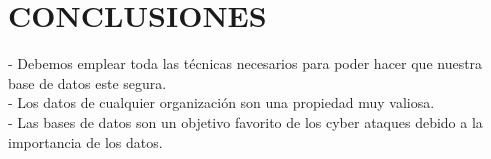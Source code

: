 \section{CONCLUSIONES}
- Debemos emplear toda las técnicas necesarios para poder hacer que nuestra base de datos este segura. \\
- Los datos de cualquier organización son una propiedad muy
valiosa.\\
- Las bases de datos son un objetivo favorito de los cyber ataques debido a la importancia de los datos.

